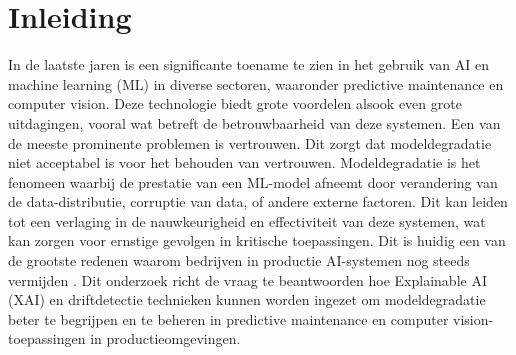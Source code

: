 


% 

\section{Inleiding}%
\label{sec:inleiding}

In de laatste jaren is een significante toename te zien in het gebruik van AI en machine learning (ML) in diverse sectoren, waaronder predictive maintenance en computer vision.
Deze technologie biedt grote voordelen alsook even grote uitdagingen, vooral wat betreft de betrouwbaarheid van deze systemen.
Een van de meeste prominente problemen is vertrouwen. Dit zorgt dat modeldegradatie niet acceptabel is voor het behouden van vertrouwen. Modeldegradatie is het fenomeen waarbij de prestatie van een ML-model afneemt door verandering van de data-distributie, corruptie van data, of andere externe factoren.
Dit kan leiden tot een verlaging in de nauwkeurigheid en effectiviteit van deze systemen, wat kan zorgen voor ernstige gevolgen in kritische toepassingen.
Dit is huidig een van de grootste redenen waarom bedrijven in productie AI-systemen nog steeds vermijden \autocite{Radhakrishnan2020}.
Dit onderzoek richt de vraag te beantwoorden hoe Explainable AI (XAI) en driftdetectie technieken kunnen worden ingezet om modeldegradatie beter te begrijpen en te beheren in predictive maintenance en computer vision-toepassingen in productieomgevingen.




